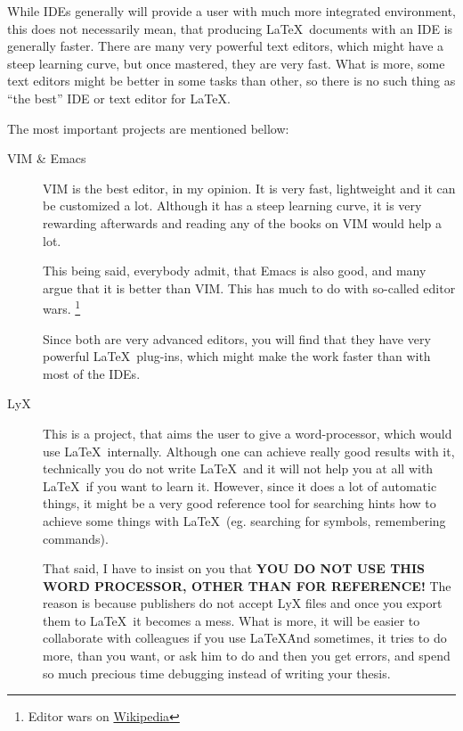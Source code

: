 While IDEs generally will provide a user with much more integrated environment,
this does not necessarily mean, that producing \LaTeX\ documents with an IDE is
generally faster. There are many very powerful text editors, which might have a
steep learning curve, but once mastered, they are very fast. What is more, some
text editors might be better in some tasks than other, so there is no such thing
as ``the best'' IDE or text editor for \LaTeX.

The most important projects are mentioned bellow:
\begin{description}
    \item[VIM \& Emacs] VIM is the best editor, in my opinion. It is very fast,
        lightweight and it can be customized a lot. Although it has a steep
        learning curve, it is very rewarding afterwards and reading any of the
        books on VIM would help a lot. 
        
        This being said, everybody admit, that Emacs is also good, and many
        argue that it is better than VIM. This has much to do with so-called
        editor wars.
        \footnote{Editor wars on
        \href{http://en.wikipedia.org/wiki/Editor_war}{Wikipedia}}

        Since both are very advanced editors, you will find that they have very
        powerful \LaTeX\ plug-ins, which might make the work faster than with
        most of the IDEs.

    \item[LyX] This is a project, that aims the user to give a word-processor,
        which would use \LaTeX\ internally. Although one can achieve really good
        results with it, technically you do not write \LaTeX\ and it will not
        help you at all with \LaTeX\ if you want to learn it. However, since it
        does a lot of automatic things, it might be a very good reference tool
        for searching hints how to achieve some things with \LaTeX\ (eg.
        searching for symbols, remembering commands). 
        
        That said, I have to insist on you that {\bfseries YOU DO NOT USE THIS
        WORD PROCESSOR, OTHER THAN FOR REFERENCE!} The reason is because
        publishers do not accept LyX files and once you export them to \LaTeX\,
        it becomes a mess. What is more, it will be easier to collaborate with
        colleagues if you use \LaTeX\. And sometimes, it tries to do more, than
        you want, or ask him to do and then you get errors, and spend so much
        precious time debugging instead of writing your thesis.


\end{description}
